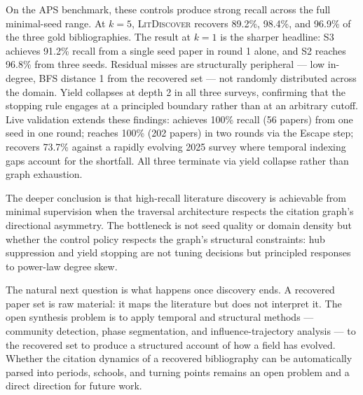 \documentclass[conference]{IEEEtran}
\newcommand{\ldiscover}{\textsc{LitDiscover}}
\begin{document}
On the APS benchmark, these controls produce strong recall across the full minimal-seed
range. At $k = 5$, \ldiscover{} recovers 89.2\%, 98.4\%, and 96.9\% of the three gold
bibliographies. The result at $k = 1$ is the sharper headline: S3 achieves 91.2\% recall
from a single seed paper in round 1 alone, and S2 reaches 96.8\% from three seeds.
Residual misses are structurally peripheral --- low in-degree, BFS distance 1 from the
recovered set --- not randomly distributed across the domain. Yield collapses at depth 2
in all three surveys, confirming that the stopping rule engages at a principled boundary
rather than at an arbitrary cutoff. Live validation extends these findings:
\citet{Bobrowski2018} achieves 100\% recall (56 papers) from one seed in one round;
\citet{Galesic2021} reaches 100\% (202 papers) in two rounds via the Escape step;
\citet{Liu2025} recovers 73.7\% against a rapidly evolving 2025 survey where temporal
indexing gaps account for the shortfall. All three terminate via yield collapse rather
than graph exhaustion.

The deeper conclusion is that high-recall literature discovery is achievable from minimal
supervision when the traversal architecture respects the citation graph's directional
asymmetry. The bottleneck is not seed quality or domain density but whether the control
policy respects the graph's structural constraints: hub suppression and yield stopping are
not tuning decisions but principled responses to power-law degree skew.

The natural next question is what happens once discovery ends. A recovered paper set is
raw material: it maps the literature but does not interpret it. The open synthesis problem
is to apply temporal and structural methods --- community detection, phase segmentation,
and influence-trajectory analysis --- to the recovered set to produce a structured account
of how a field has evolved. Whether the citation dynamics of a recovered bibliography can
be automatically parsed into periods, schools, and turning points remains an open
problem and a direct direction for future work.



\end{document}
